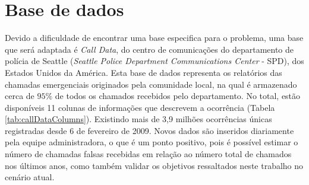 \section{Base de dados}
Devido a dificuldade de encontrar uma base especifica para o problema, uma base que será adaptada é \textit{Call Data}, do centro de comunicações do departamento de polícia de Seattle (\textit{Seattle Police Department Communications Center} - SPD), dos Estados Unidos da América. Esta base de dados representa os relatórios das chamadas emergenciais originados pela comunidade local, na qual é armazenado cerca de $95\%$ de todos os chamados recebidos pelo departamento. No total, estão disponíveis 11 colunas de informações que descrevem a ocorrência (Tabela \ref{tab:callDataColumns}). Existindo mais de 3,9 milhões ocorrências únicas registradas desde 6 de fevereiro de 2009. Novos dados são inseridos diariamente pela equipe administradora, o que é um ponto positivo, pois é possível estimar o número de chamadas falsas recebidas em relação ao número total de chamados nos últimos anos, como também validar os objetivos ressaltados neste trabalho no cenário atual.

